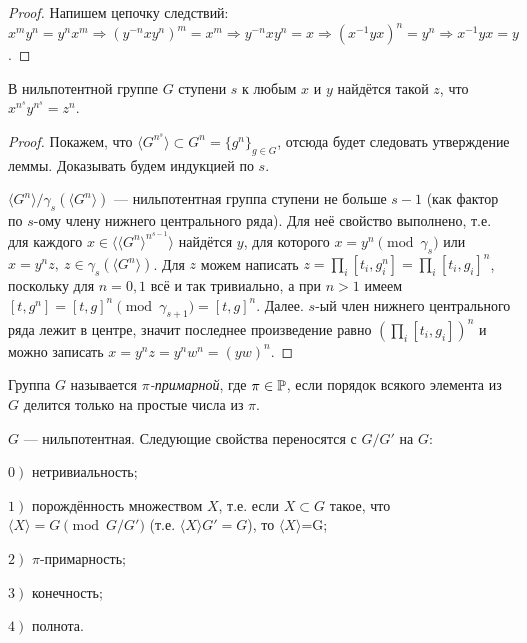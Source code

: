 \documentclass[10pt,a4paper]{article}
\begin{document}
\begin{proof} Напишем цепочку следствий: $x^my^n=y^nx^m\Rightarrow
(y^{-n}xy^n)^m=x^m\Rightarrow y^{-n}xy^n=x\Rightarrow
(x^{-1}yx)^n=y^n\Rightarrow x^{-1}yx=y$. \end{proof}

\begin{theorem}В нильпотентной группе $G$ ступени $s$ к любым $x$ и
$y$ найдётся такой $z$, что $x^{n^s}y^{n^s}=z^n$.
\end{theorem}

\begin{proof} Покажем, что $\langle G^{n^s}\rangle\subset
G^n=\{g^n\}_{g\in G}$, отсюда будет следовать утверждение леммы.
Доказывать будем индукцией по $s$.

$\langle G^n\rangle/\gamma_s(\langle G^n\rangle)$ ---
нильпотентная группа ступени не больше $s-1$ (как фактор по
$s$-ому члену нижнего центрального ряда). Для неё свойство
выполнено, т.е. для каждого $x\in\langle\!\langle
G^n\rangle^{n^{s-1}}\rangle$ найдётся $y$, для которого
$x=y^n\pmod{\gamma_s}$ или $x=y^nz,~z\in\gamma_s(\langle
G^n\rangle)$. Для $z$ можем написать
$z=\prod\limits_i[t_i,g_i^n]=\prod\limits_i[t_i,g_i]^n$, поскольку
для $n=0,1$ всё и так тривиально, а при $n>1$ имеем
$[t,g^n]=[t,g]^n\pmod{\gamma_{s+1}}=[t,g]^n$. Далее. $s$-ый член
нижнего центрального ряда лежит в центре, значит последнее
произведение равно $(\prod\limits_i[t_i,g_i])^n$ и можно записать
$x=y^nz=y^nw^n=(yw)^n$.\end{proof}

Группа $G$ называется {\em
$\pi$-примарной}, где $\pi\in\mathbb P$,
если порядок всякого элемента из $G$ делится только на простые
числа из $\pi$.

\begin{theorem}
{$G$ --- нильпотентная. Следующие свойства переносятся с $G/G'$ на
$G$:
\par $\left.0\right)$ нетривиальность;
\par $\left.1\right)$ порождённость множеством $X$, т.е. если $X\subset
G$ такое, что $\langle X\rangle=G\pmod{G/G'}$ (т.е. ${\langle
X\rangle G'=G}$), то $\langle X\rangle$=G;
\par $\left.2\right)$ $\pi$-примарность;
\par $\left.3\right)$ конечность;
\par $\left.4\right)$ полнота.}\label{from quotient to group}
\end{theorem}
\end{document}
